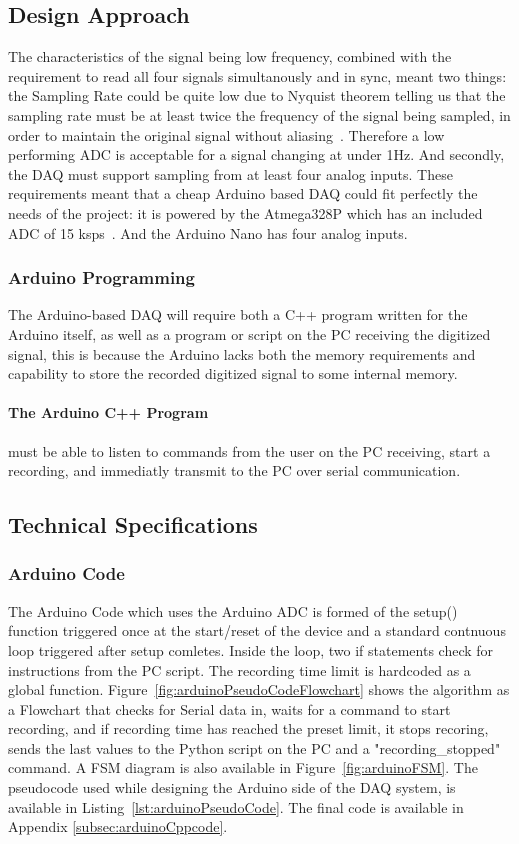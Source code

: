 \subsection{Design Approach}
The characteristics of the signal being low frequency, combined with the requirement to read all four signals simultanously and in sync, meant two things: the Sampling Rate could be quite low due to Nyquist theorem telling us that the sampling rate must be at least twice the frequency of the signal being sampled, in order to maintain the original signal without aliasing~\cite[p. 146]{RefWorks:oppenheim2013discrete-time}. Therefore a low performing ADC is acceptable for a signal changing at under 1Hz. And secondly, the DAQ must support sampling from at least four analog inputs. These requirements meant that a cheap Arduino based DAQ could fit perfectly the needs of the project: it is powered by the Atmega328P which has an included ADC of 15 ksps~\cite[p.205]{RefWorks:atmel2015atmega328p}. And the Arduino Nano has four analog inputs. 
\subsubsection{Arduino Programming}
The Arduino-based DAQ will require both a C++ program written for the Arduino itself, as well as a program or script on the PC receiving the digitized signal, this is because the Arduino lacks both the memory requirements and capability to store the recorded digitized signal to some internal memory.
\paragraph{The Arduino C++ Program} must be able to listen to commands from the user on the PC receiving, start a recording, and immediatly transmit to the PC over serial communication. 

\subsection{Technical Specifications}


\subsubsection{Arduino Code}
The Arduino Code which uses the Arduino ADC is formed of the setup() function triggered once at the start/reset of the device and a standard contnuous loop triggered after setup comletes. Inside the loop, two if statements check for instructions from the PC script. The recording time limit is hardcoded as a global function. Figure~\ref{fig:arduinoPseudoCodeFlowchart} shows the algorithm as a Flowchart that checks for Serial data in, waits for a command to start recording, and if recording time has reached the preset limit, it stops recoring, sends the last values to the Python script on the PC and a "recording\_stopped" command. A FSM diagram is also available in Figure~\ref{fig:arduinoFSM}. The pseudocode used while designing the Arduino side of the DAQ system, is available in Listing~\ref{lst:arduinoPseudoCode}. The final code is available in Appendix \ref{subsec:arduinoCppcode}.
